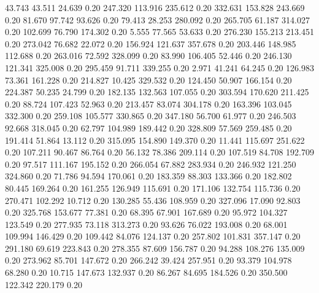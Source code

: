   43.743   43.511   24.639         0.20
 247.320  113.916  235.612         0.20
 332.631  153.828  243.669         0.20
  81.670   97.742   93.626         0.20
  79.413   28.253  280.092         0.20
 265.705   61.187  314.027         0.20
 102.699   76.790  174.302         0.20
   5.555   77.565   53.633         0.20
 276.230  155.213  213.451         0.20
 273.042   76.682   22.072         0.20
 156.924  121.637  357.678         0.20
 203.446  148.985  112.688         0.20
 263.016   72.592  328.099         0.20
  83.990  106.405   52.446         0.20
 246.130  121.341  325.008         0.20
 295.459   91.711  339.255         0.20
   2.971   41.241   64.245         0.20
 126.983   73.361  161.228         0.20
 214.827   10.425  329.532         0.20
 124.450   50.907  166.154         0.20
 224.387   50.235   24.799         0.20
 182.135  132.563  107.055         0.20
 303.594  170.620  211.425         0.20
  88.724  107.423   52.963         0.20
 213.457   83.074  304.178         0.20
 163.396  103.045  332.300         0.20
 259.108  105.577  330.865         0.20
 347.180   56.700   61.977         0.20
 246.503   92.668  318.045         0.20
  62.797  104.989  189.442         0.20
 328.809   57.569  259.485         0.20
 191.414   51.864   13.112         0.20
 315.095  154.890  149.370         0.20
  11.441  115.697  251.622         0.20
 107.211   90.467   86.764         0.20
  56.132   78.386  209.114         0.20
 107.519   84.708  192.709         0.20
  97.517  111.167  195.152         0.20
 266.054   67.882  283.934         0.20
 246.932  121.250  324.860         0.20
  71.786   94.594  170.061         0.20
 183.359   88.303  133.366         0.20
 182.802   80.445  169.264         0.20
 161.255  126.949  115.691         0.20
 171.106  132.754  115.736         0.20
 270.471  102.292   10.712         0.20
 130.285   55.436  108.959         0.20
 327.096   17.090   92.803         0.20
 325.768  153.677   77.381         0.20
  68.395   67.901  167.689         0.20
  95.972  104.327  123.549         0.20
 277.935   73.118  313.273         0.20
  93.626   76.022  193.008         0.20
  68.001  109.994  146.429         0.20
 109.442   84.076  124.137         0.20
 257.802  101.831  357.147         0.20
 291.180   69.619  223.843         0.20
 278.355   87.609  156.787         0.20
  94.288  108.276  135.009         0.20
 273.962   85.701  147.672         0.20
 266.242   39.424  257.951         0.20
  93.379  104.978   68.280         0.20
  10.715  147.673  132.937         0.20
  86.267   84.695  184.526         0.20
 350.500  122.342  220.179         0.20
